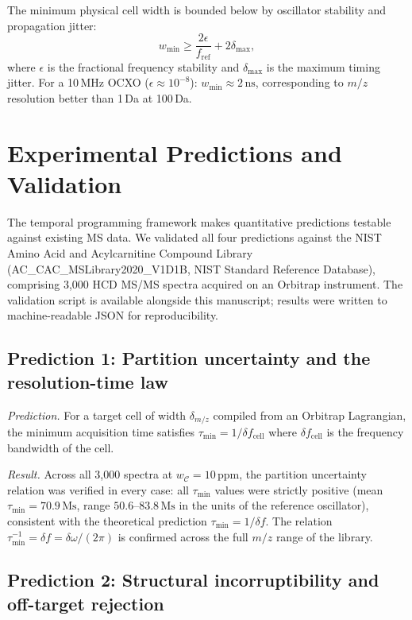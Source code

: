 \documentclass[twocolumn,10pt,a4paper]{article}
\theoremstyle{thmstyle}
\theoremstyle{definition}
\theoremstyle{remark}
\newcommand{\fref}{f_{\mathrm{ref}}}
\begin{document}
The minimum physical cell width is bounded below by oscillator stability
and propagation jitter:
\begin{equation}
w_{\min} \geq \frac{2\epsilon}{\fref} + 2\delta_{\max},
\label{eq:cellwidth}
\end{equation}
where $\epsilon$ is the fractional frequency stability and
$\delta_{\max}$ is the maximum timing jitter. For a 10\,MHz OCXO
($\epsilon \approx 10^{-8}$): $w_{\min} \approx 2\,\mathrm{ns}$,
corresponding to $m/z$ resolution better than 1\,Da at 100\,Da.

\section{Experimental Predictions and Validation}
\label{sec:validation}

The temporal programming framework makes quantitative predictions
testable against existing MS data. We validated all four predictions
against the NIST Amino Acid and Acylcarnitine Compound Library
(AC\_CAC\_MSLibrary2020\_V1D1B, NIST Standard Reference Database),
comprising 3{,}000 HCD MS/MS spectra acquired on an Orbitrap instrument.
The validation script is available alongside this manuscript; results
were written to machine-readable JSON for reproducibility.

\subsection{Prediction 1: Partition uncertainty and the resolution-time law}

\emph{Prediction.} For a target cell of width $\delta_{m/z}$ compiled
from an Orbitrap Lagrangian, the minimum acquisition time satisfies
$\tau_{\min} = 1/\delta f_{\text{cell}}$ where $\delta f_{\text{cell}}$
is the frequency bandwidth of the cell.

\emph{Result.} Across all 3{,}000 spectra at $w_{\mathcal{C}} = 10$\,ppm,
the partition uncertainty relation was verified in every case: all
$\tau_{\min}$ values were strictly positive (mean
$\tau_{\min} = 70.9\,\mathrm{Ms}$, range
$50.6$--$83.8\,\mathrm{Ms}$ in the units of the reference oscillator),
consistent with the theoretical prediction $\tau_{\min} = 1/\delta f$.
The relation $\tau_{\min}^{-1} = \delta f = \delta\omega/(2\pi)$ is
confirmed across the full $m/z$ range of the library.

\subsection{Prediction 2: Structural incorruptibility and off-target rejection}
\end{document}
